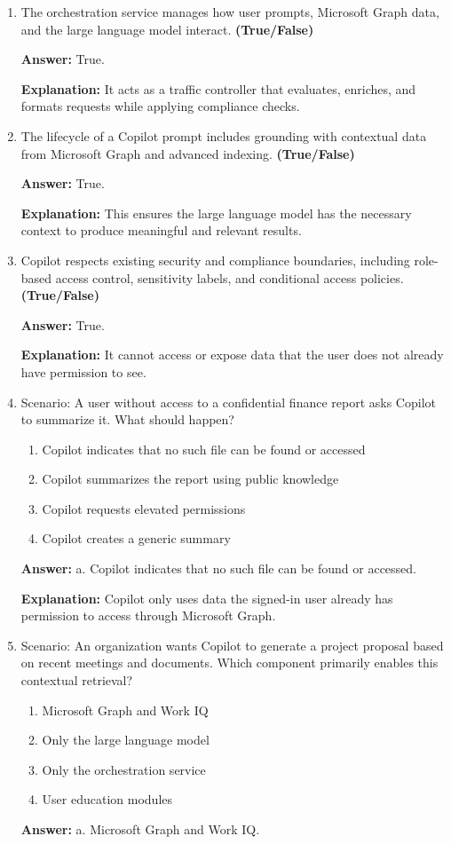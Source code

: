 \documentclass[10pt]{article}
\begin{document}
\begin{enumerate}[leftmargin=*]
\item The orchestration service manages how user prompts, Microsoft Graph data, and the large language model interact. \textbf{(True/False)}

\textbf{Answer:} True.

\textbf{Explanation:} It acts as a traffic controller that evaluates, enriches, and formats requests while applying compliance checks.

\item The lifecycle of a Copilot prompt includes grounding with contextual data from Microsoft Graph and advanced indexing. \textbf{(True/False)}

\textbf{Answer:} True.

\textbf{Explanation:} This ensures the large language model has the necessary context to produce meaningful and relevant results.

\item Copilot respects existing security and compliance boundaries, including role-based access control, sensitivity labels, and conditional access policies. \textbf{(True/False)}

\textbf{Answer:} True.

\textbf{Explanation:} It cannot access or expose data that the user does not already have permission to see.

\item Scenario: A user without access to a confidential finance report asks Copilot to summarize it. What should happen?
\begin{enumerate}[label=\alph*., leftmargin=1.5em]
\item Copilot indicates that no such file can be found or accessed
\item Copilot summarizes the report using public knowledge
\item Copilot requests elevated permissions
\item Copilot creates a generic summary
\end{enumerate}
\textbf{Answer:} a. Copilot indicates that no such file can be found or accessed.

\textbf{Explanation:} Copilot only uses data the signed-in user already has permission to access through Microsoft Graph.

\item Scenario: An organization wants Copilot to generate a project proposal based on recent meetings and documents. Which component primarily enables this contextual retrieval?
\begin{enumerate}[label=\alph*., leftmargin=1.5em]
\item Microsoft Graph and Work IQ
\item Only the large language model
\item Only the orchestration service
\item User education modules
\end{enumerate}
\textbf{Answer:} a. Microsoft Graph and Work IQ.


\end{enumerate}
\end{document}
